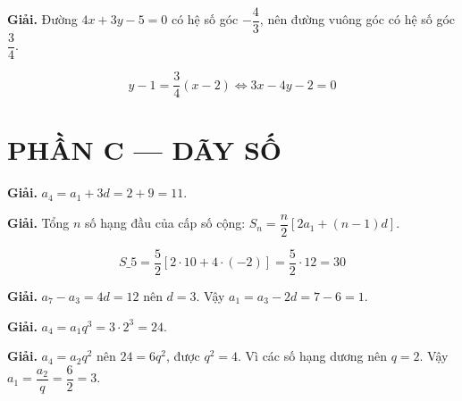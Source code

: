 \documentclass[11pt, a4paper]{article}
\begin{document}
\vspace{0.3cm}
\begin{dapan}[19 — Đáp án D]

\textbf{Giải.} Đường $4x + 3y - 5 = 0$ có hệ số góc $-\dfrac{4}{3}$, nên đường vuông góc có hệ số góc $\dfrac{3}{4}$.

$$y - 1 = \dfrac{3}{4}(x - 2) \iff 3x - 4y - 2 = 0$$

\section{PHẦN C — DÃY SỐ}


\end{dapan}
\vspace{0.3cm}
\begin{dapan}[20 — Đáp án C]

\textbf{Giải.} $a_4 = a_1 + 3d = 2 + 9 = 11$.


\end{dapan}
\vspace{0.3cm}
\begin{dapan}[21 — Đáp án C]

\textbf{Giải.} Tổng $n$ số hạng đầu của cấp số cộng: $S_n = \dfrac{n}{2}\left[2a_1 + (n-1)d\right]$.

$$S\_5 = \dfrac{5}{2}\left[2 \cdot 10 + 4 \cdot (-2)\right] = \dfrac{5}{2} \cdot 12 = 30$$


\end{dapan}
\vspace{0.3cm}
\begin{dapan}[22 — Đáp án D]

\textbf{Giải.} $a_7 - a_3 = 4d = 12$ nên $d = 3$. Vậy $a_1 = a_3 - 2d = 7 - 6 = 1$.


\end{dapan}
\vspace{0.3cm}
\begin{dapan}[23 — Đáp án C]

\textbf{Giải.} $a_4 = a_1 q^3 = 3 \cdot 2^3 = 24$.


\end{dapan}
\vspace{0.3cm}
\begin{dapan}[24 — Đáp án A]

\textbf{Giải.} $a_4 = a_2 q^2$ nên $24 = 6q^2$, được $q^2 = 4$. Vì các số hạng dương nên $q = 2$. Vậy $a_1 = \dfrac{a_2}{q} = \dfrac{6}{2} = 3$.


\end{dapan}
\vspace{0.3cm}
\end{document}
